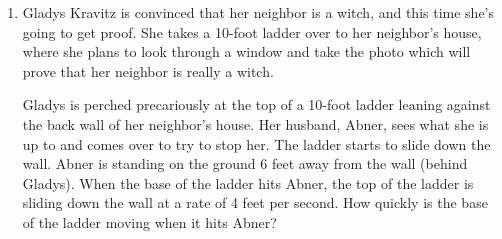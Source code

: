 \documentclass{article}
\begin{document}
\begin{enumerate}
\begin{solution}
\begin{enumerate}[label=\Alph*.]
      \item $\displaystyle\int_{10}^{1} \ln t \ dt = -\displaystyle\int_1^{10} \ln t \ dt$. We can visualize $\displaystyle\int_1^{10} \ln t \ dt$ signed area under the graph of $\ln t$ between $t=1$ and $t=10$, pictured below:

      \begin{center}
      \end{center}

        Because the area pictured is positive, $\displaystyle\int_{10}^{1} \ln t \ dt$ must be negative, so $H < D$.

    \end{enumerate}

    So, our final answer is $\boxed{H< D < B < A = G < C < E < F}$.
  \end{solution}

  \item 
  \label{spring2006-midterm1-related-rates}
  
  \begin{problem}[\newpage]
    Gladys Kravitz is convinced that her neighbor is a witch, and this
    time she's going to get proof.  She takes a 10-foot ladder over to her
    neighbor's house, where she plans to look through a window and take
    the photo which will prove that her neighbor is really a witch.

    Gladys is perched precariously at the top of a 10-foot ladder leaning
    against the back wall of her neighbor's house. Her husband, Abner,
    sees what she is up to and comes over to try to stop her. The ladder
    starts to slide down the wall. Abner is standing on the ground 6 feet
    away from the wall (behind Gladys). When the base of the ladder hits
    Abner, the top of the ladder is sliding down the wall at a rate of 4
    feet per second. How quickly is the base of the ladder moving when it
    hits Abner?


\end{problem}
\end{enumerate}
\end{document}
